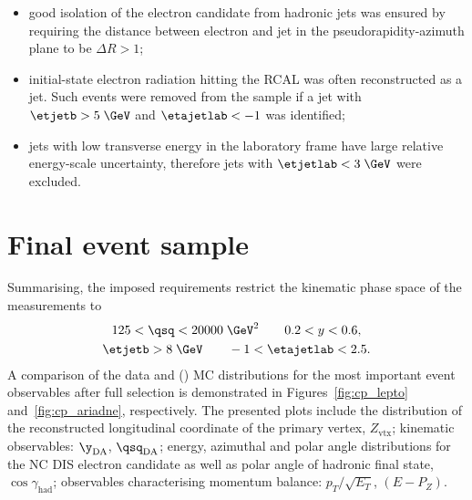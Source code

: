 \begin{itemize}
	\item good isolation of the electron candidate from hadronic jets was ensured by requiring the distance between electron and jet in the pseudorapidity-azimuth plane to be $\Delta R > 1$;
	\item initial-state electron radiation hitting the RCAL was often reconstructed as a jet. Such events were removed from the sample if a jet with $\etjetb > 5\;\GeV$ and $\etajetlab < -1$ was identified;
	\item jets with low transverse energy in the laboratory frame have large relative energy-scale uncertainty, therefore jets with $\etjetlab < 3\;\GeV$ were excluded.
\end{itemize}

\section{Final event sample}
\label{sec:eventsampletab}
Summarising, the imposed requirements restrict the kinematic phase space of the measurements to
\begin{gather}
125 < \qsq < 20000\;\GeV^2 \qquad 0.2 < y < 0.6, \\
\etjetb > 8\;\GeV \qquad -1 < \etajetlab < 2.5.
\end{gather}
A comparison of the data and \ariadne (\lepto) MC distributions for the most important event observables after full selection is demonstrated in Figures~\ref{fig:cp_lepto} and~\ref{fig:cp_ariadne}, respectively. The presented plots include the distribution of the reconstructed longitudinal coordinate of the primary vertex, $Z_\text{vtx}$; kinematic observables: $\y_\text{DA}$, $\qsq_\text{DA}$; energy, azimuthal and polar angle distributions for the NC DIS electron candidate as well as polar angle of hadronic final state, $\cos{\gamma_\text{had}}$; observables characterising momentum balance: $p_T/\sqrt{E_T}$, $\left(E-P_Z\right)$. 

